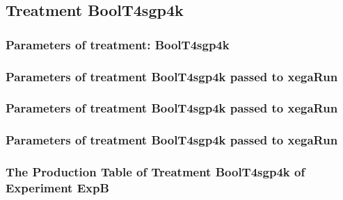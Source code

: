 \documentclass[18pt,c]{beamer}
\makeatletter
\def\beamer@writeslidentry@miniframesoff{%
  \expandafter\beamer@ifempty\expandafter{\beamer@framestartpage}{}%
  {%
   \clearpage\beamer@notesactions%
  }
}
\newcommand*{\miniframesoff}{\let\beamer@writeslidentry=\beamer@writeslidentry@miniframesoff}
\makeatother
\begin{document}
\miniframesoff
\subsection{Treatment BoolT4sgp4k}

 \begin{frame}
 \fontsize{8pt}{9pt}\selectfont
 \frametitle{  Parameters of treatment: BoolT4sgp4k 
 }

 \label{ExpBtParmTable088.tex}  
 \end{frame}


 \begin{frame}
 \fontsize{8pt}{9pt}\selectfont
 \frametitle{  Parameters of treatment BoolT4sgp4k passed to xegaRun
 }

 \label{ExpBtParmTable089.tex}  
 \end{frame}


 \begin{frame}
 \fontsize{8pt}{9pt}\selectfont
 \frametitle{  Parameters of treatment BoolT4sgp4k passed to xegaRun
 }

 \label{ExpBtParmTable090.tex}  
 \end{frame}


 \begin{frame}
 \fontsize{8pt}{9pt}\selectfont
 \frametitle{  Parameters of treatment BoolT4sgp4k passed to xegaRun
 }

 \label{ExpBtParmTable091.tex}  
 \end{frame}

 \begin{frame}
 \fontsize{8pt}{9pt}\selectfont
 \frametitle{ The Production Table of Treatment BoolT4sgp4k of Experiment ExpB }

 \label{ExpBGrammarTable028.tex}  
 \end{frame}
\end{document}
